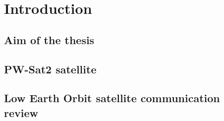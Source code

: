 \chapter{Introduction}

\section{Aim of the thesis}

\section{PW-Sat2 satellite}

\section{Low Earth Orbit satellite communication review}


